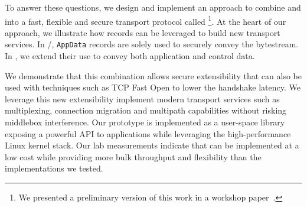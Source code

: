 To answer these questions, we design and implement an approach to combine 
\tcp and  into a fast, flexible and secure transport protocol called \textbf{\tcpls}
%
\footnote{We presented a preliminary version of this work in a workshop paper~\cite{rochet2020tcpls}.}. 
At the heart of our approach, we illustrate how \tls records can be leveraged to build new transport services. In \tcp/\tls, \tls \texttt{AppData} records are solely used to securely convey the \tcp bytestream. In \tcpls, we extend their use to convey both application and control data.

We demonstrate that this combination allows secure extensibility that can also be used with techniques such as TCP Fast Open \cite{rfc7413} to lower the handshake latency. We leverage this new extensibility implement modern transport services such as multiplexing, connection migration and multipath capabilities without risking middlebox interference. Our \tcpls prototype is implemented as a user-space library exposing a powerful API to applications while leveraging the high-performance Linux kernel \tcp stack. Our lab measurements indicate that \tcpls can be implemented at a low cost while providing more bulk throughput and flexibility than the \quic implementations we tested.
 


